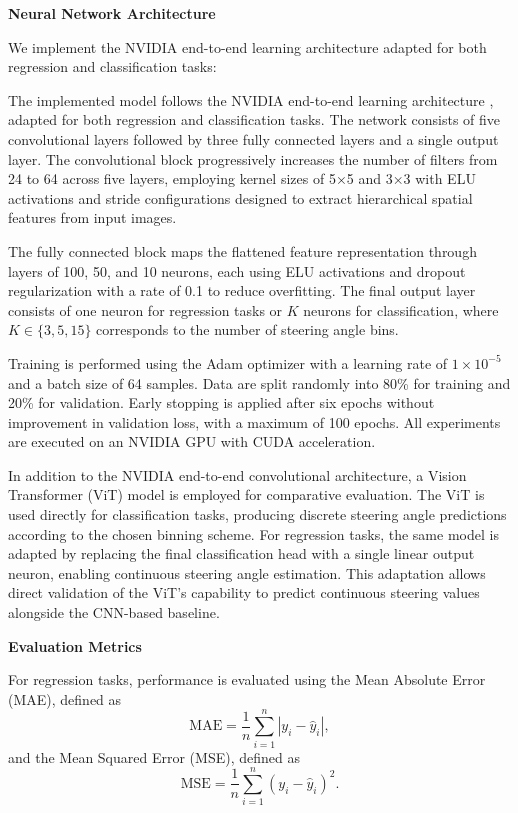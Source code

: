 \textbf{Neural Network Architecture}

We implement the NVIDIA end-to-end learning architecture \cite{bojarski2016end} adapted for both regression and classification tasks:

The implemented model follows the NVIDIA end-to-end learning architecture \cite{bojarski2016end}, adapted for both regression and classification tasks. The network consists of five convolutional layers followed by three fully connected layers and a single output layer. The convolutional block progressively increases the number of filters from 24 to 64 across five layers, employing kernel sizes of 5×5 and 3×3 with ELU activations and stride configurations designed to extract hierarchical spatial features from input images.  

The fully connected block maps the flattened feature representation through layers of 100, 50, and 10 neurons, each using ELU activations and dropout regularization with a rate of 0.1 to reduce overfitting. The final output layer consists of one neuron for regression tasks or \(K\) neurons for classification, where \(K \in \{3, 5, 15\}\) corresponds to the number of steering angle bins.  

Training is performed using the Adam optimizer with a learning rate of \(1\times10^{-5}\) and a batch size of 64 samples. Data are split randomly into 80\% for training and 20\% for validation. Early stopping is applied after six epochs without improvement in validation loss, with a maximum of 100 epochs. All experiments are executed on an NVIDIA GPU with CUDA acceleration.

In addition to the NVIDIA end-to-end convolutional architecture, a Vision Transformer (ViT) model is employed for comparative evaluation. The ViT is used directly for classification tasks, producing discrete steering angle predictions according to the chosen binning scheme. For regression tasks, the same model is adapted by replacing the final classification head with a single linear output neuron, enabling continuous steering angle estimation. This adaptation allows direct validation of the ViT’s capability to predict continuous steering values alongside the CNN-based baseline.

\textbf{Evaluation Metrics}

For regression tasks, performance is evaluated using the Mean Absolute Error (MAE), defined as  
\[
\text{MAE} = \frac{1}{n}\sum_{i=1}^{n}|y_i - \hat{y}_i|,
\]
and the Mean Squared Error (MSE), defined as  
\[
\text{MSE} = \frac{1}{n}\sum_{i=1}^{n}(y_i - \hat{y}_i)^2.
\]

